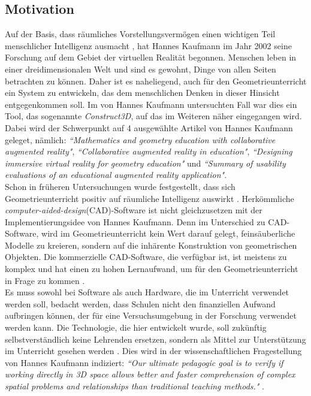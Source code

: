 \documentclass[deutsch]{llncs}
\begin{document}
\subsection{Motivation}
Auf der Basis, dass räumliches Vorstellungsvermögen einen wichtigen Teil menschlicher Intelligenz ausmacht \cite{spatial}, hat Hannes Kaufmann im Jahr 2002 seine Forschung auf dem Gebiet der virtuellen Realität begonnen.
Menschen leben in einer dreidimensionalen Welt und sind es gewohnt, Dinge von allen Seiten betrachten zu können. Daher ist es naheliegend, auch für den Geometrieunterricht ein System zu entwickeln,
das dem menschlichen Denken in dieser Hinsicht entgegenkommen soll. Im von Hannes Kaufmann untersuchten Fall war dies ein Tool, das sogenannte \emph{Construct3D}, auf das im Weiteren näher eingegangen wird. Dabei wird der Schwerpunkt auf 4 ausgewählte Artikel von Hannes Kaufmann geleget, nämlich:  \emph{``Mathematics and geometry education with collaborative augmented reality"}\cite{Kaufmann:2002:MGE:1242073.1242086}, \emph{``Collaborative augmented reality in education"}\cite{article}, \emph{``Designing immersive virtual reality for geometry education"} \cite{1667626} und \emph{``Summary of usability evaluations of an educational augmented reality application"}\cite{Kaufmann_summaryof}. \\

 Schon in früheren Untersuchungen wurde festgestellt, dass sich Geometrieunterricht positiv auf räumliche Intelligenz auswirkt \cite{GittlerDifferentialTO}.
Herkömmliche  \emph{computer-aided-design}(CAD)-Software  ist nicht gleichzusetzen mit der Implementierungsidee von Hannes Kaufmann. Denn im Unterschied zu CAD-Software, wird im Geometrieunterricht kein Wert darauf gelegt, feinsäuberliche Modelle zu kreieren, sondern auf die inhärente Konstruktion von geometrischen Objekten. Die kommerzielle CAD-Software, die verfügbar ist, ist meistens zu komplex und hat einen zu hohen Lernaufwand, um für den Geometrieunterricht in Frage zu kommen  \cite{Kaufmann:2002:MGE:1242073.1242086}. \\
Es muss sowohl bei Software als auch Hardware, die im Unterricht verwendet werden soll, bedacht werden, dass Schulen nicht den finanziellen Aufwand aufbringen können, der für eine Versuchsumgebung in der Forschung verwendet werden kann.  Die Technologie, die hier entwickelt wurde, soll zukünftig selbstverständlich keine Lehrenden ersetzen, sondern als Mittel zur Unterstützung im Unterricht gesehen werden \cite{article}. Dies wird in der wissenschaftlichen Fragestellung von Hannes Kaufmann indiziert: \emph{``Our ultimate pedagogic goal is to verify if working directly in 3D space allows better and faster comprehension of complex spatial problems and relationships than traditional teaching methods."} \cite{1667626}. \\
\end{document}

